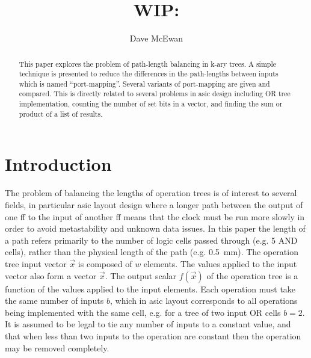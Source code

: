 \documentclass[11pt,twoside]{article}
\author{Dave McEwan}
\title{WIP: \doctitle}
\date{}
\newcommand*{\ShowAbstract}{} %
\newcommand*{\ShowFrontmatter}{} %
\begin{document}
\ifdefined\SansFontFamily
    \sffamily
\fi

\ifdefined\ShowFrontmatter
    \maketitle

    \ifdefined\ShowAbstract
        \begin{abstract}
This paper explores the problem of path-length balancing in k-ary trees.
A simple technique is presented to reduce the differences in the path-lengths
between inputs which is named ``port-mapping''.
Several variants of port-mapping are given and compared.
This is directly related to several problems in \gls{asic} design including OR
tree implementation, counting the number of set bits in a vector, and finding
the sum or product of a list of results.

        \end{abstract}
    \fi
\fi

\setcounter{tocdepth}{2}

\section{Introduction}
The problem of balancing the lengths of operation trees is of interest to
several fields, in particular \gls{asic} layout design where a longer path
between the output of one \gls{ff} to the input of another \gls{ff} means that
the clock must be run more slowly in order to avoid metastability and unknown
data issues.
In this paper the length of a path refers primarily to the number of logic cells
passed through (e.g. 5 AND cells), rather than the physical length of the path
(e.g. \SI{0.5}{\mm}).
The operation tree input vector $\vec{x}$ is composed of $w$ elements.
The values applied to the input vector also form a vector $\vec{x}$.
The output scalar $f(\vec{x})$ of the operation tree is a function of the values
applied to the input elements.
Each operation must take the same number of inputs $b$, which in \gls{asic}
layout corresponds to all operations being implemented with the same cell,
e.g. for a tree of two input OR cells $b = 2$.
It is assumed to be legal to tie any number of inputs to a constant value,
and that when less than two inputs to the operation are constant then the
operation may be removed completely.
\end{document}
